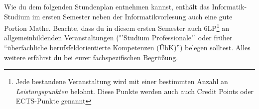 Wie du dem folgenden Stundenplan entnehmen kannst, enthält das Informatik-Studium im ersten
Semester neben der Informatikvorlesung auch eine gute Portion Mathe. Beachte, dass du
in diesem ersten Semester auch 6LP\footnote{Jede bestandene Veranstaltung wird mit einer bestimmten Anzahl an \emph{Leistungspunkten} belohnt. Diese Punkte werden auch auch Credit Points oder ECTS-Punkte genannt} an allgemeinbildenden Veranstaltungen ("'Studium Professionale"' oder früher "`überfachliche berufsfeldorientierte Kompetenzen (ÜbK)"') belegen solltest.
Alles weitere erfährst du bei eurer fachspezifischen Begrüßung.

\noindent{}

